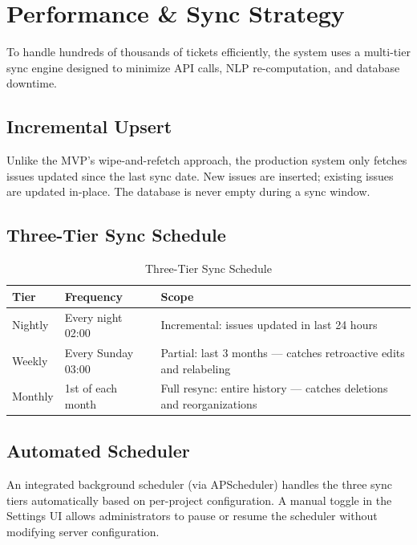 \documentclass[12pt, a4paper]{article}
\begin{document}
\section{Performance \& Sync Strategy}

To handle hundreds of thousands of tickets efficiently, the system uses a multi-tier sync engine designed to minimize API calls, NLP re-computation, and database downtime.

\subsection{Incremental Upsert}

Unlike the MVP's wipe-and-refetch approach, the production system only fetches issues updated since the last sync date. New issues are inserted; existing issues are updated in-place. The database is never empty during a sync window.

\subsection{Three-Tier Sync Schedule}

\begin{table}[H]
\centering
\caption{Three-Tier Sync Schedule}
\begin{tabularx}{\textwidth}{|l|l|X|}
\hline
\textbf{Tier} & \textbf{Frequency} & \textbf{Scope} \\
\hline
Nightly & Every night 02:00   & Incremental: issues updated in last 24 hours \\
Weekly  & Every Sunday 03:00  & Partial: last 3 months — catches retroactive edits and relabeling \\
Monthly & 1st of each month   & Full resync: entire history — catches deletions and reorganizations \\
\hline
\end{tabularx}
\end{table}

\subsection{Automated Scheduler}

An integrated background scheduler (via APScheduler) handles the three sync tiers automatically based on per-project configuration. A manual toggle in the Settings UI allows administrators to pause or resume the scheduler without modifying server configuration.
\end{document}
